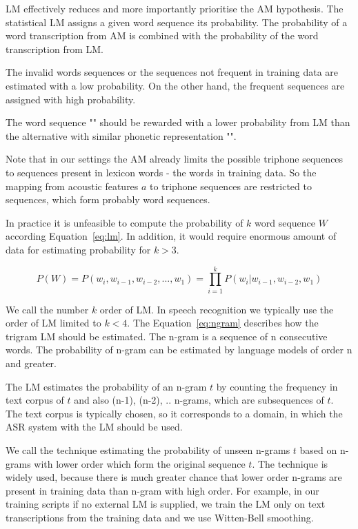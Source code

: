 {\ac{LM} effectively reduces and more importantly prioritise the \ac{AM} hypothesis.
The statistical \ac{LM} assigns a given word sequence its probability.
The probability of a word transcription from \ac{AM} is combined with the probability of the word transcription from \ac{LM}.

The invalid words sequences or the sequences not frequent in training data are estimated with a low probability. 
On the other hand, the frequent sequences are assigned with high probability.

The word sequence "" should be rewarded with a lower probability from \ac{LM} than the alternative with similar phonetic representation "".

Note that in our settings the \ac{AM} already limits the possible triphone sequences to sequences present in lexicon words - the words in training data.
So the mapping from acoustic features $a$ to triphone sequences are restricted to sequences, which form probably word sequences.

In practice it is unfeasible to compute the probability of $k$ word sequence $W$ according Equation~\ref{eq:lm}.
In addition, it would require enormous amount of data for estimating probability for $k>3$.


\begin{equation} \label{eq:lm}
    P(W)=P(w_i,  w_{i-1}, w_{i-2}, ..., w_1)=\prod_{i=1}^{k}{P(w_i|w_{i-1}, w_{i-2}, w_1)}
\end{equation}

We call the number $k$ order of \ac{LM}.
In speech recognition we typically use the order of \ac{LM} limited to $k<4$.
The Equation~\ref{eq:ngram} describes how the trigram \ac{LM} should be estimated.
The n-gram is a sequence of n consecutive words. The probability of n-gram can be estimated by language models
of order n and greater.

The \ac{LM} estimates the probability of an n-gram $t$ by counting the frequency in text corpus of $t$ and 
also (n-1), (n-2), .. n-grams, which are subsequences of $t$.
The text corpus is typically chosen, so it corresponds to a domain, in which the \ac{ASR} system 
with the \ac{LM} should be used.

We call the  technique estimating the probability of unseen n-grams $t$ 
based on n-grams with lower order which form the original sequence $t$.
The technique is widely used, because there is much greater chance that lower order n-grams are
present in training data than n-gram with high order.
For example, in our training scripts if no external \ac{LM} is supplied,
we train the \ac{LM} only on text transcriptions from the training data
and we use Witten-Bell smoothing.\cite{witten1991zero}

}

